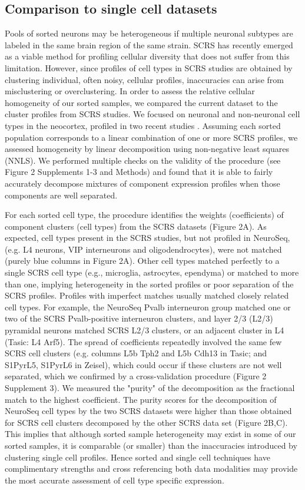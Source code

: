\subsection{Comparison to single cell datasets}
Pools of sorted neurons may be heterogeneous if multiple neuronal subtypes are labeled in the same brain region of the same strain. SCRS has recently emerged as a viable method for profiling cellular diversity that does not suffer from this limitation. However, since profiles of cell types in SCRS studies are obtained by clustering individual, often noisy, cellular profiles, inaccuracies can arise from misclustering or overclustering. In order to assess the relative cellular homogeneity of our sorted samples, we compared the current dataset to the cluster profiles from SCRS studies. We focused on neuronal and non-neuronal cell types in the neocortex, profiled in two recent studies \citep{Tasic_2016,Zeisel_2015}. Assuming  each sorted population corresponds to a linear combination of one or more SCRS profiles, we assessed homogeneity by linear decomposition using non-negative least squares (NNLS). We performed multiple checks on the validity of the procedure (see Figure 2 Supplements 1-3 and Methods) and found that it is able to fairly accurately decompose mixtures of component expression profiles when those components are well separated. 

For each sorted cell type, the procedure identifies the weights (coefficients) of  component clusters (cell types) from the SCRS datasets (Figure 2A). As expected, cell types present in the SCRS studies, but not profiled in NeuroSeq, (e.g. L4 neurons, VIP interneurons and oligodendrocytes), were not matched (purely blue columns in Figure 2A). Other cell types matched perfectly to a single SCRS cell type (e.g., microglia, astrocytes, ependyma) or matched to more than one, implying heterogeneity in the sorted profiles or poor separation of the SCRS profiles. Profiles with imperfect matches usually matched closely related cell types. For example, the NeuroSeq Pvalb interneuron group matched one or two of the SCRS Pvalb-positive interneuron clusters, and layer 2/3 (L2/3) pyramidal neurons matched SCRS L2/3 clusters, or an adjacent cluster in L4 (Tasic: L4 Arf5). The spread of coefficients repeatedly involved the same few SCRS cell clusters (e.g. columns L5b Tph2 and L5b Cdh13 in Tasic; and S1PyrL5,  S1PyrL6 in Zeisel), which could occur if these clusters are not well separated, which we confirmed by a cross-validation procedure (Figure 2 Supplement 3). We measured the "purity" of the decomposition as the fractional match to the highest coefficient. The purity scores for the decomposition of NeuroSeq cell types by the two SCRS datasets were higher than those obtained for SCRS cell clusters decomposed by the other SCRS data set (Figure 2B,C). This implies that although sorted sample heterogeneity may exist in some of our sorted samples, it is comparable (or smaller) than the inaccuracies introduced by clustering single cell profiles. Hence sorted and single cell techniques have complimentary strengths and cross referencing both data modalities may provide the most accurate assessment of cell type specific expression. 



